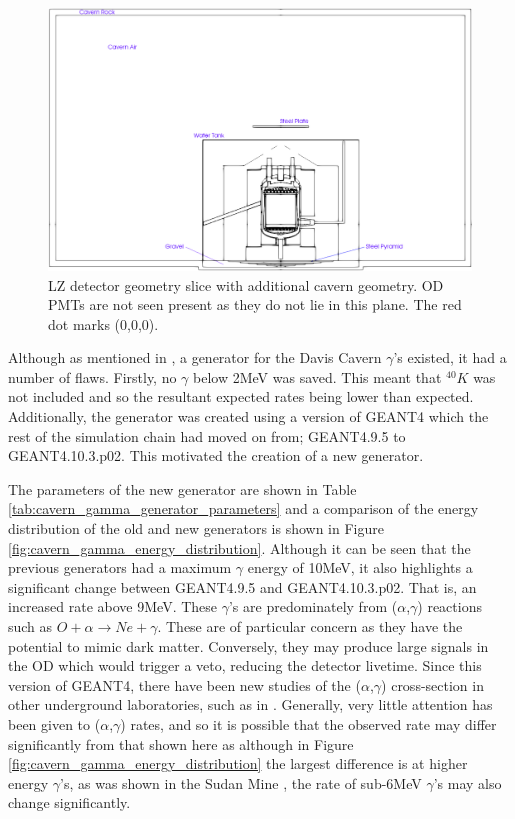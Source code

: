 \begin{figure}[!htbp]
\includegraphics[width=\textwidth]{Figures/Geometry/cavern_geometry_with_markings.png}
\centering
\caption{LZ detector geometry slice with additional cavern geometry. OD PMTs are not seen present as they do not lie in this plane. The red dot marks (0,0,0).}
\label{fig:Cavern_Geometry}
\end{figure}

\par
Although as mentioned in \cite{scotthaselschwardt_thesis_ref}, a generator for the Davis Cavern $\gamma$'s existed, it had a number of flaws.
Firstly, no $\gamma$ below 2MeV was saved.
This meant that $^{40}K$ was not included and so the resultant expected rates being lower than expected.
Additionally, the generator was created using a version of GEANT4 which the rest of the simulation chain had moved on from; GEANT4.9.5 to GEANT4.10.3.p02. 
This motivated the creation of a new generator.

\par
The parameters of the new generator are shown in Table \ref{tab:cavern_gamma_generator_parameters} and a comparison of the energy distribution of the old and new generators is shown in Figure \ref{fig:cavern_gamma_energy_distribution}.
Although it can be seen that the previous generators had a maximum $\gamma$ energy of 10MeV, it also highlights a significant change between GEANT4.9.5 and GEANT4.10.3.p02.
That is, an increased rate above 9MeV.
These $\gamma$'s are predominately from ($\alpha$,$\gamma$) reactions such as $O + \alpha \to Ne + \gamma$.
These are of particular concern as they have the potential to mimic dark matter.
Conversely, they may produce large signals in the OD which would trigger a veto, reducing the detector livetime.
Since this version of GEANT4, there have been new studies of the ($\alpha$,$\gamma$) cross-section in other underground laboratories, such as in \cite{cavern_gammas_in_Soudan_mine_ref}.
Generally, very little attention has been given to ($\alpha$,$\gamma$) rates, and so it is possible that the observed rate may differ significantly from that shown here as although in Figure \ref{fig:cavern_gamma_energy_distribution} the largest difference is at higher energy $\gamma$'s, as was shown in the Sudan Mine \cite{cavern_gammas_in_Soudan_mine_ref}, the rate of sub-6MeV $\gamma$'s may also change significantly. 

